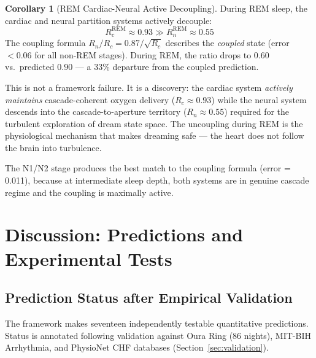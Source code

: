\documentclass[12pt,a4paper]{article}
\theoremstyle{definition}
\newtheorem{corollary}[theorem]{Corollary}
\begin{document}
\begin{corollary}[REM Cardiac-Neural Active Decoupling]
\label{cor:rem_decoupling}
During REM sleep, the cardiac and neural partition systems actively decouple:
\begin{equation}
R_c^{\mathrm{REM}} \approx 0.93 \gg R_n^{\mathrm{REM}} \approx 0.55
\end{equation}
The coupling formula $R_n/R_c = 0.87/\sqrt{R_c}$ describes the
\emph{coupled} state (error $< 0.06$ for all non-REM stages). During REM,
the ratio drops to $0.60$ vs.\ predicted $0.90$ --- a 33\% departure
from the coupled prediction.
\end{corollary}

This is not a framework failure. It is a discovery: the cardiac system
\emph{actively maintains} cascade-coherent oxygen delivery ($R_c \approx 0.93$)
while the neural system descends into the cascade-to-aperture territory
($R_n \approx 0.55$) required for the turbulent exploration of dream state
space. The uncoupling during REM is the physiological mechanism that makes
dreaming safe --- the heart does not follow the brain into turbulence.

The N1/N2 stage produces the best match to the coupling formula (error = 0.011),
because at intermediate sleep depth, both systems are in genuine cascade
regime and the coupling is maximally active.

\section{Discussion: Predictions and Experimental Tests}
\label{sec:discussion}

\subsection{Prediction Status after Empirical Validation}

The framework makes seventeen independently testable quantitative predictions.
Status is annotated following validation against Oura Ring (86 nights),
MIT-BIH Arrhythmia, and PhysioNet CHF databases (Section~\ref{sec:validation}).
\end{document}
